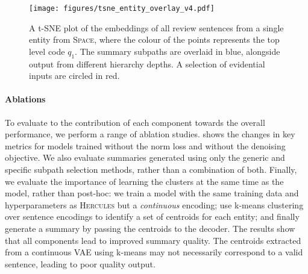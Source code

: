 \documentclass[11pt]{article}
\begin{document}
\begin{figure*}[ht!]
    \centering
    
    \texttt{[image: figures/tsne\_entity\_overlay\_v4.pdf]}
\caption{A t-SNE \cite{tsne} plot of the embeddings of all review sentences from a single entity from \textsc{Space}, where the colour of the points represents the top level code $q_1$. The summary subpaths are overlaid in blue, alongside output from different hierarchy depths. A selection of evidential inputs are circled in red.}
    \vspace{-0.4cm}
    \label{fig:tsne}
\end{figure*}


\paragraph{Ablations}


To evaluate to the contribution of each component towards the overall performance, we perform a range of ablation studies.  shows the changes in key metrics for models trained without the norm loss and without the denoising objective. We also evaluate summaries generated using only the generic and specific subpath selection methods, rather than a combination of both. Finally, we evaluate the importance of learning the clusters at the same time as the model, rather than post-hoc: we train a model with the same training data and hyperparameters as \textsc{Hercules} but a \textit{continuous} encoding; use k-means clustering over sentence encodings to identify a set of centroids for each entity; and finally generate a summary by passing the centroids to the decoder. The results show that all components lead to improved summary quality. 
The centroids extracted from a continuous VAE using k-means may not necessarily correspond to a valid sentence, leading to poor quality output.
\end{document}
